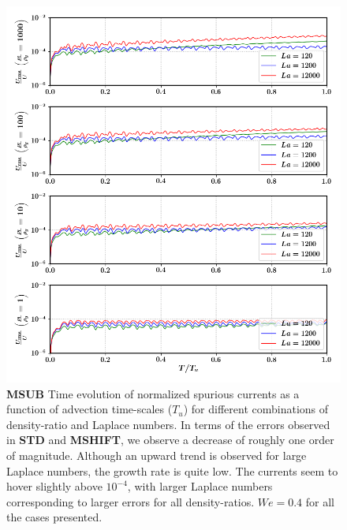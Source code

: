 \begin{figure}[h!]
    \centering
    \includegraphics[]{plots/droplet_advect/evo_sagar.png}
	\caption{\textbf{MSUB} Time evolution of normalized spurious currents as a function of advection time-scales ($T_u$) for different combinations of density-ratio and Laplace numbers. In terms of the errors observed in \textbf{STD} and \textbf{MSHIFT}, we observe a decrease of roughly one order of magnitude. Although an upward trend is observed for large Laplace numbers, the growth rate is quite low. The currents seem to hover slightly above $10^{-4}$, with larger Laplace numbers corresponding to larger errors for all density-ratios. $We = 0.4$ for all the cases presented.}   
    \label{evo_sagar}
\end{figure}


